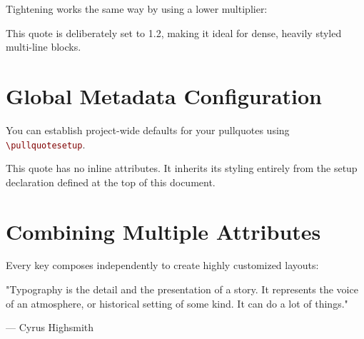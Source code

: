 \documentclass[12pt, a4paper]{article}
\let\oldtexttt\texttt
\renewcommand{\texttt}[1]{\textcolor{Maroon}{\oldtexttt{#1}}}
\begin{document}
Tightening works the same way by using a lower multiplier:

\begin{pullquote}[size=l, skip=1.2]
This quote is deliberately set to 1.2, making it ideal for dense, heavily styled multi-line blocks.
\end{pullquote}

\section*{Global Metadata Configuration}

You can establish project-wide defaults for your pullquotes using \texttt{\textbackslash pullquotesetup}.


\begin{pullquote}
This quote has no inline attributes. It inherits its styling entirely from the setup declaration defined at the top of this document.
\end{pullquote}


\section*{Combining Multiple Attributes}

Every key composes independently to create highly customized layouts:

\begin{pullquote}[font={Georgia}, style=italic, size=xl, width=0.8\linewidth, boxalign=center, color=DarkSlateGray, barcolor=SteelBlue, barwidth=4pt, paddingleft=1.5em, skip=1.55]
"Typography is the detail and the presentation of a story. It represents the voice of an atmosphere, or historical setting of some kind. It can do a lot of things."

— Cyrus Highsmith
\end{pullquote}
\end{document}
